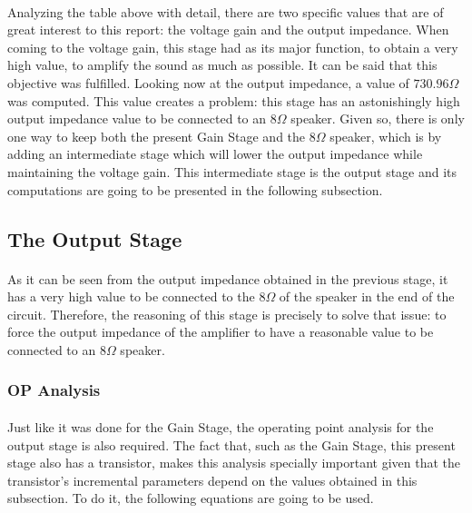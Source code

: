 \paragraph{}Analyzing the table above with detail, there are two specific values that are of great interest to this report: the voltage gain and the output impedance. When coming to the voltage gain, this stage had as its major function, to obtain a very high value, to amplify the sound as much as possible. It can be said that this objective was fulfilled. Looking now at the output impedance, a value of  $730.96 \Omega$ was computed. This value creates a problem: this stage has an astonishingly high output impedance value to be connected to an $8 \Omega$ speaker. Given so, there is only one way to keep both the present Gain Stage and the $8 \Omega$ speaker, which is by adding an intermediate stage which will lower the output impedance while maintaining the voltage gain. This intermediate stage is the output stage and its computations are going to be presented in the following subsection. 





\subsection{The Output Stage}

\paragraph{}As it can be seen from the output impedance obtained in the previous stage, it has a very high value to be connected to the $8\Omega$ of the speaker in the end of the circuit. Therefore, the reasoning of this stage is precisely to solve that issue: to force the output impedance of the amplifier to have a reasonable value to be connected to an $8 \Omega$  speaker.


\subsubsection{OP Analysis}

\paragraph{}Just like it was done for the Gain Stage, the operating point analysis for the output stage is also required. The fact that, such as the Gain Stage, this present stage also has a transistor, makes this analysis specially important given that the transistor's incremental parameters depend on the values obtained in this subsection. To do it, the following equations are going to be used.


